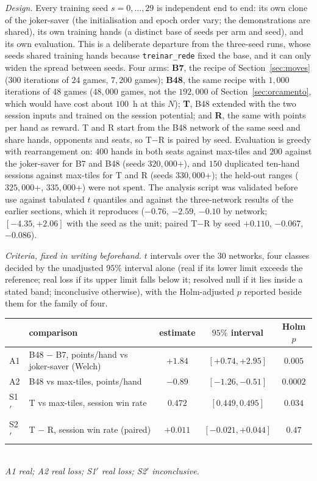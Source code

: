 \documentclass[11pt]{article}
\begin{document}
\emph{Design.} Every training seed $s=0,\dots,29$ is independent end to end: its own clone of the joker-saver (the initialisation and epoch order vary; the demonstrations are shared), its own training hands (a distinct base of seeds per arm and seed), and its own evaluation. This is a deliberate departure from the three-seed runs, whose seeds shared training hands because \texttt{treinar\_rede} fixed the base, and it can only widen the spread between seeds. Four arms: \textbf{B7}, the recipe of Section~\ref{sec:moves} ($300$ iterations of $24$ games, $7{,}200$ games); \textbf{B48}, the same recipe with $1{,}000$ iterations of $48$ games ($48{,}000$ games, not the $192{,}000$ of Section~\ref{sec:orcamento}, which would have cost about $100$~h at this $N$); \textbf{T}, B48 extended with the two session inputs and trained on the session potential; and \textbf{R}, the same with points per hand as reward. T and R start from the B48 network of the same seed and share hands, opponents and seats, so T$-$R is paired by seed. Evaluation is greedy with rearrangement on: $400$ hands in both seats against max-tiles and $200$ against the joker-saver for B7 and B48 (seeds $320{,}000$+), and $150$ duplicated ten-hand sessions against max-tiles for T and R (seeds $330{,}000$+); the held-out ranges ($325{,}000$+, $335{,}000$+) were not spent. The analysis script was validated before use against tabulated $t$ quantiles and against the three-network results of the earlier sections, which it reproduces ($-0.76$, $-2.59$, $-0.10$ by network; $[-4.35,+2.06]$ with the seed as the unit; paired T$-$R by seed $+0.110$, $-0.067$, $-0.086$).

\emph{Criteria, fixed in writing beforehand.} $t$ intervals over the $30$ networks, four classes decided by the unadjusted $95\%$ interval alone (real if its lower limit exceeds the reference; real loss if its upper limit falls below it; resolved null if it lies inside a stated band; inconclusive otherwise), with the Holm-adjusted $p$ reported beside them for the family of four.

\begin{center}\small
\begin{tabular}{llccc}\toprule
 & comparison & estimate & $95\%$ interval & Holm $p$\\\midrule
A1 & B48 $-$ B7, points/hand vs joker-saver (Welch) & $+1.84$ & $[+0.74,+2.95]$ & $0.005$\\
A2 & B48 vs max-tiles, points/hand & $-0.89$ & $[-1.26,-0.51]$ & $0.0002$\\
S1$'$ & T vs max-tiles, session win rate & $0.472$ & $[0.449,0.495]$ & $0.034$\\
S2$'$ & T $-$ R, session win rate (paired) & $+0.011$ & $[-0.021,+0.044]$ & $0.47$\\\bottomrule
\end{tabular}\\[2pt]
\emph{A1 real; A2 real loss; S1$'$ real loss; S2$'$ inconclusive.}
\end{center}
\end{document}
